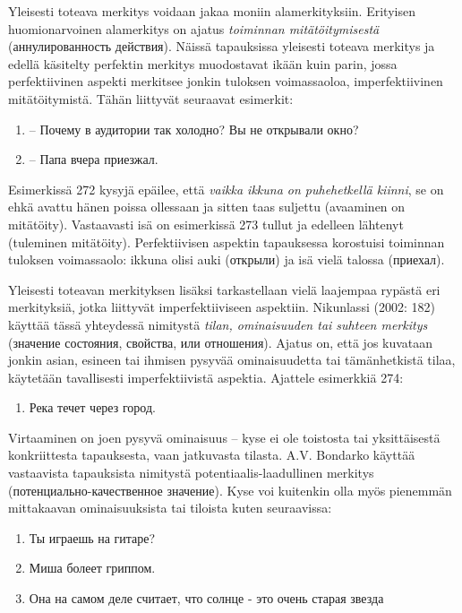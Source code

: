 \documentclass[]{scrartcl}
\providecommand{\tightlist}{%
  \setlength{\itemsep}{0pt}\setlength{\parskip}{0pt}}
\begin{document}
Yleisesti toteava merkitys voidaan jakaa moniin alamerkityksiin.
Erityisen huomionarvoinen alamerkitys on ajatus \emph{toiminnan
mitätöitymisestä} (аннулированность действия). Näissä tapauksissa
yleisesti toteava merkitys ja edellä käsitelty perfektin merkitys
muodostavat ikään kuin parin, jossa perfektiivinen aspekti merkitsee
jonkin tuloksen voimassaoloa, imperfektiivinen mitätöitymistä. Tähän
liittyvät seuraavat esimerkit:

\begin{enumerate}
\def\labelenumi{(\arabic{enumi})}
\setcounter{enumi}{271}
\tightlist
\item
  -- Почему в аудитории так холодно? Вы не открывали окно?
\item
  -- Папа вчера приезжал.
\end{enumerate}

Esimerkissä 272 kysyjä epäilee, että \emph{vaikka ikkuna on puhehetkellä
kiinni}, se on ehkä avattu hänen poissa ollessaan ja sitten taas
suljettu (avaaminen on mitätöity). Vastaavasti isä on esimerkissä 273
tullut ja edelleen lähtenyt (tuleminen mitätöity). Perfektiivisen
aspektin tapauksessa korostuisi toiminnan tuloksen voimassaolo: ikkuna
olisi auki (открыли) ja isä vielä talossa (приехал).

Yleisesti toteavan merkityksen lisäksi tarkastellaan vielä laajempaa
rypästä eri merkityksiä, jotka liittyvät imperfektiiviseen aspektiin.
Nikunlassi (2002: 182) käyttää tässä yhteydessä nimitystä \emph{tilan,
ominaisuuden tai suhteen merkitys} (значение состояния, свойства, или
отношения). Ajatus on, että jos kuvataan jonkin asian, esineen tai
ihmisen pysyvää ominaisuudetta tai tämänhetkistä tilaa, käytetään
tavallisesti imperfektiivistä aspektia. Ajattele esimerkkiä 274:

\begin{enumerate}
\def\labelenumi{(\arabic{enumi})}
\setcounter{enumi}{273}
\tightlist
\item
  Река течет через город.
\end{enumerate}

Virtaaminen on joen pysyvä ominaisuus -- kyse ei ole toistosta tai
yksittäisestä konkriittesta tapauksesta, vaan jatkuvasta tilasta. A.V.
Bondarko käyttää vastaavista tapauksista nimitystä
potentiaalis-laadullinen merkitys (потенциально-качественное значение).
Kyse voi kuitenkin olla myös pienemmän mittakaavan ominaisuuksista tai
tiloista kuten seuraavissa:

\begin{enumerate}
\def\labelenumi{(\arabic{enumi})}
\setcounter{enumi}{274}
\tightlist
\item
  Ты играешь на гитаре?
\item
  Миша болеет гриппом.
\item
  Она на самом деле считает, что солнце - это очень старая звезда
\end{enumerate}
\end{document}

